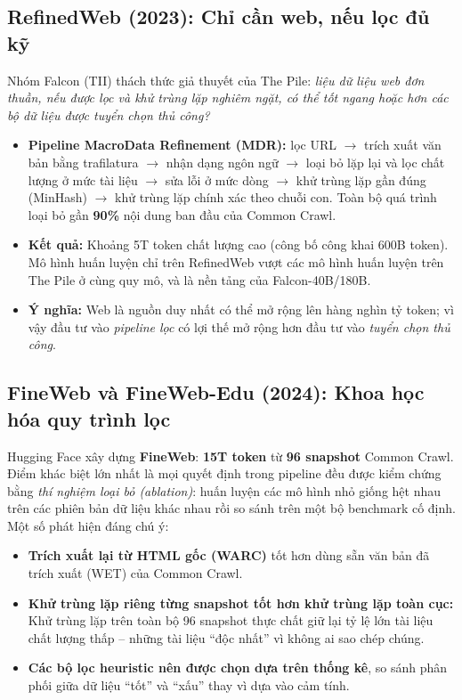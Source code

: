\subsection{RefinedWeb (2023): Chỉ cần web, nếu lọc đủ kỹ}
\label{ssec:refinedweb}
Nhóm Falcon (TII) \cite{penedo2023refinedweb} thách thức giả thuyết của The Pile: \emph{liệu dữ liệu web đơn thuần, nếu được lọc và khử trùng lặp nghiêm ngặt, có thể tốt ngang hoặc hơn các bộ dữ liệu được tuyển chọn thủ công?}
\begin{itemize}
	\item \textbf{Pipeline MacroData Refinement (MDR):} lọc URL $\rightarrow$ trích xuất văn bản bằng trafilatura $\rightarrow$ nhận dạng ngôn ngữ $\rightarrow$ loại bỏ lặp lại và lọc chất lượng ở mức tài liệu $\rightarrow$ sửa lỗi ở mức dòng $\rightarrow$ khử trùng lặp gần đúng (MinHash) $\rightarrow$ khử trùng lặp chính xác theo chuỗi con. Toàn bộ quá trình loại bỏ gần \textbf{90\%} nội dung ban đầu của Common Crawl.
	\item \textbf{Kết quả:} Khoảng 5T token chất lượng cao (công bố công khai 600B token). Mô hình huấn luyện chỉ trên RefinedWeb vượt các mô hình huấn luyện trên The Pile ở cùng quy mô, và là nền tảng của Falcon-40B/180B.
	\item \textbf{Ý nghĩa:} Web là nguồn duy nhất có thể mở rộng lên hàng nghìn tỷ token; vì vậy đầu tư vào \emph{pipeline lọc} có lợi thế mở rộng hơn đầu tư vào \emph{tuyển chọn thủ công}.
\end{itemize}

\subsection{FineWeb và FineWeb-Edu (2024): Khoa học hóa quy trình lọc}
\label{ssec:fineweb}
Hugging Face \cite{penedo2024fineweb} xây dựng \textbf{FineWeb}: \textbf{15T token} từ \textbf{96 snapshot} Common Crawl. Điểm khác biệt lớn nhất là mọi quyết định trong pipeline đều được kiểm chứng bằng \emph{thí nghiệm loại bỏ (ablation)}: huấn luyện các mô hình nhỏ giống hệt nhau trên các phiên bản dữ liệu khác nhau rồi so sánh trên một bộ benchmark cố định. Một số phát hiện đáng chú ý:
\begin{itemize}
	\item \textbf{Trích xuất lại từ HTML gốc (WARC)} tốt hơn dùng sẵn văn bản đã trích xuất (WET) của Common Crawl.
	\item \textbf{Khử trùng lặp riêng từng snapshot tốt hơn khử trùng lặp toàn cục:} Khử trùng lặp trên toàn bộ 96 snapshot thực chất giữ lại tỷ lệ lớn tài liệu chất lượng thấp -- những tài liệu “độc nhất” vì không ai sao chép chúng.
	\item \textbf{Các bộ lọc heuristic nên được chọn dựa trên thống kê}, so sánh phân phối giữa dữ liệu “tốt” và “xấu” thay vì dựa vào cảm tính.
\end{itemize}

